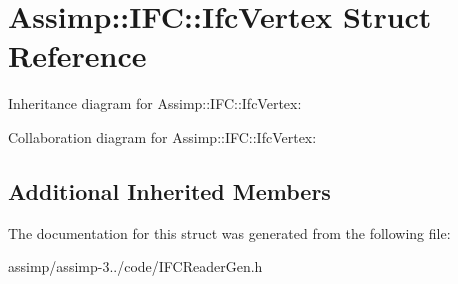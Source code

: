 \hypertarget{struct_assimp_1_1_i_f_c_1_1_ifc_vertex}{\section{Assimp\+:\+:I\+F\+C\+:\+:Ifc\+Vertex Struct Reference}
\label{struct_assimp_1_1_i_f_c_1_1_ifc_vertex}
}


Inheritance diagram for Assimp\+:\+:I\+F\+C\+:\+:Ifc\+Vertex\+:


Collaboration diagram for Assimp\+:\+:I\+F\+C\+:\+:Ifc\+Vertex\+:
\subsection*{Additional Inherited Members}


The documentation for this struct was generated from the following file\+:\begin{DoxyCompactItemize}
\item 
assimp/assimp-\/3../code/I\+F\+C\+Reader\+Gen.\+h\end{DoxyCompactItemize}
